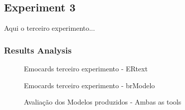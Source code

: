 \cleardoublepage

\subsection{Experiment 3}
\label{ssec_experiments:Experiment3}
Aqui o terceiro experimento...

\subsubsection{Results Analysis}

\begin{figure}[!htb]
    \centering
    \caption{Emocards terceiro experimento - ERtext}
    \label{fig:Emocards4_alt}
    
\end{figure}

\begin{figure}[!htb]
    \centering
    \caption{Emocards terceiro experimento - brModelo}
    \label{fig:Emocards3_alt}
    
\end{figure}

\begin{figure}[!htb]
    \centering
    \caption{Avaliação dos Modelos produzidos - Ambas as tools}
    \label{fig:ToolModelsEval}
    
\end{figure}

%     

%     

%     

